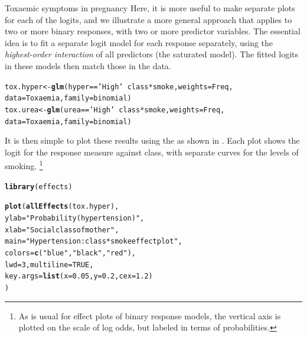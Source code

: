 \documentclass[11pt]{book}\usepackage[]{graphicx}\usepackage[]{color}
\makeatletter
\newcommand{\hlnum}[1]{\textcolor[rgb]{0.686,0.059,0.569}{#1}}%
\newcommand{\hlstr}[1]{\textcolor[rgb]{0.192,0.494,0.8}{#1}}%
\newcommand{\hlopt}[1]{\textcolor[rgb]{0,0,0}{#1}}%
\newcommand{\hlstd}[1]{\textcolor[rgb]{0.345,0.345,0.345}{#1}}%
\newcommand{\hlkwb}[1]{\textcolor[rgb]{0.69,0.353,0.396}{#1}}%
\newcommand{\hlkwc}[1]{\textcolor[rgb]{0.333,0.667,0.333}{#1}}%
\newcommand{\hlkwd}[1]{\textcolor[rgb]{0.737,0.353,0.396}{\textbf{#1}}}%
\newenvironment{kframe}{%
 \def\at@end@of@kframe{}%
 \ifinner\ifhmode%
  \def\at@end@of@kframe{\end{minipage}}%
  \begin{minipage}{\columnwidth}%
 \fi\fi%
 \def\FrameCommand##1{\hskip\@totalleftmargin \hskip-\fboxsep
 \colorbox{shadecolor}{##1}\hskip-\fboxsep
     \hskip-\linewidth \hskip-\@totalleftmargin \hskip\columnwidth}%
 \MakeFramed {\advance\hsize-\width
   \@totalleftmargin\z@ \linewidth\hsize
   \@setminipage}}%
 {\par\unskip\endMakeFramed%
 \at@end@of@kframe}
\newenvironment{knitrout}{}{} %
\renewenvironment{knitrout}{\small\renewcommand{\baselinestretch}{.85}}{} %
\makeatother
\begin{document}
\begin{Example}[toxaemia]{Toxaemic symptoms in pregnancy}
Here, it is more useful to make separate plots for each of the logits,
and we illustrate a more general approach that applies to two or more
binary responses, with two or more predictor variables.
The essential idea is to fit a separate logit model for each response
separately, using the \emph{highest-order interaction} of all predictors
(the saturated model).  The fitted logits in these models then match
those in the data.
\begin{knitrout}
\color{fgcolor}\begin{kframe}
\begin{alltt}
\hlstd{tox.hyper} \hlkwb{<-} \hlkwd{glm}\hlstd{(hyper}\hlopt{==}\hlstr{'High'} \hlopt{~} \hlstd{class}\hlopt{*}\hlstd{smoke,} \hlkwc{weights}\hlstd{=Freq,}
                 \hlkwc{data}\hlstd{=Toxaemia,} \hlkwc{family}\hlstd{=binomial)}
\hlstd{tox.urea} \hlkwb{<-} \hlkwd{glm}\hlstd{(urea}\hlopt{==}\hlstr{'High'} \hlopt{~} \hlstd{class}\hlopt{*}\hlstd{smoke,} \hlkwc{weights}\hlstd{=Freq,}
                \hlkwc{data}\hlstd{=Toxaemia,} \hlkwc{family}\hlstd{=binomial)}
\end{alltt}
\end{kframe}
\end{knitrout}

It is then simple to plot these results using the 
as shown in . Each plot shows the logit for
the response measure against class, with separate curves for the levels of smoking.%
\footnote{
As is usual for effect plots of binary response  models, the vertical axis
is plotted on the scale of log odds, but labeled in terms of probabilities.
}

\begin{knitrout}
\color{fgcolor}\begin{kframe}
\begin{alltt}
\hlkwd{library}\hlstd{(effects)}

\hlkwd{plot}\hlstd{(}\hlkwd{allEffects}\hlstd{(tox.hyper),}
  \hlkwc{ylab} \hlstd{=} \hlstr{"Probability (hypertension)"}\hlstd{,}
  \hlkwc{xlab} \hlstd{=} \hlstr{"Social class of mother"}\hlstd{,}
  \hlkwc{main} \hlstd{=} \hlstr{"Hypertension: class*smoke effect plot"}\hlstd{,}
  \hlkwc{colors} \hlstd{=} \hlkwd{c}\hlstd{(}\hlstr{"blue"}\hlstd{,} \hlstr{"black"}\hlstd{,} \hlstr{"red"}\hlstd{),}
  \hlkwc{lwd}\hlstd{=}\hlnum{3}\hlstd{,}  \hlkwc{multiline}\hlstd{=}\hlnum{TRUE}\hlstd{,}
  \hlkwc{key.args}\hlstd{=}\hlkwd{list}\hlstd{(}\hlkwc{x}\hlstd{=}\hlnum{0.05}\hlstd{,} \hlkwc{y}\hlstd{=}\hlnum{0.2}\hlstd{,} \hlkwc{cex}\hlstd{=}\hlnum{1.2}\hlstd{)}
  \hlstd{)}


\end{alltt}
\end{kframe}
\end{knitrout}
\end{Example}
\end{document}
